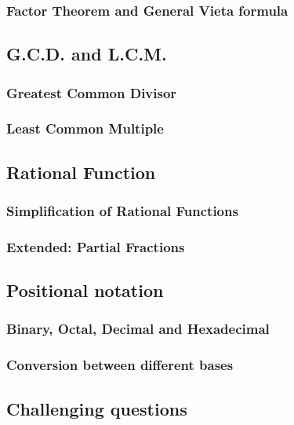 \documentclass[12pt]{article}
\begin{document}
    \subsubsection*{Factor Theorem and General Vieta formula}

    \subsection{G.C.D. and L.C.M.}

    \subsubsection*{Greatest Common Divisor}

    \subsubsection*{Least Common Multiple}

    \subsection{Rational Function}

    \subsubsection*{Simplification of Rational Functions}

    \subsubsection*{Extended: Partial Fractions}

    \subsection{Positional notation}

    \subsubsection*{Binary, Octal, Decimal and Hexadecimal}

    \subsubsection*{Conversion between different bases}

    \subsection{Challenging questions}
\end{document}

